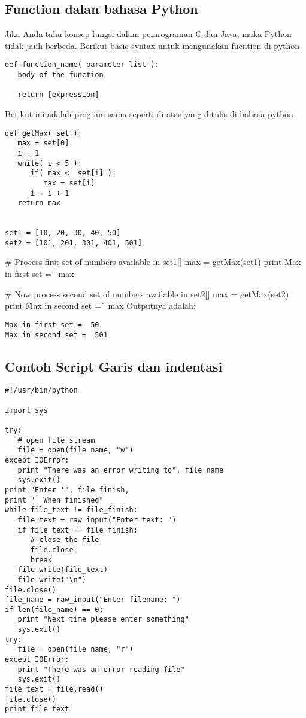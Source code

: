 \begin{enumerate}
\subsection {Function dalan bahasa Python}
Jika Anda tahu konsep fungsi dalam pemrograman C dan Java, maka Python tidak jauh berbeda. Berikut basic syntax untuk mengunakan fucntion di python 

\begin {verbatim}
def function_name( parameter list ):
   body of the function
   
   return [expression]
\end {verbatim}
Berikut ini adalah program sama seperti di atas yang ditulis di bahasa python 
\begin {verbatim}
def getMax( set ):
   max = set[0]
   i = 1  
   while( i < 5 ):
      if( max <  set[i] ):
         max = set[i]
      i = i + 1
   return max
 
 
set1 = [10, 20, 30, 40, 50]
set2 = [101, 201, 301, 401, 501]
\end {verbatim}
 
# Process first set of numbers available in set1[]
max = getMax(set1)
print \"Max in first set = \"\, max
     
# Now process second set of numbers available in set2[]
max = getMax(set2)
print \"Max in second set = \"\, max
Outputnya adalah: 
\begin {verbatim}
Max in first set =  50
Max in second set =  501
\end {verbatim}

\subsection{Contoh Script Garis dan indentasi}
\begin{verbatim}
#!/usr/bin/python

import sys

try:
   # open file stream
   file = open(file_name, "w")
except IOError:
   print "There was an error writing to", file_name
   sys.exit()
print "Enter '", file_finish,
print "' When finished"
while file_text != file_finish:
   file_text = raw_input("Enter text: ")
   if file_text == file_finish:
      # close the file
      file.close
      break
   file.write(file_text)
   file.write("\n")
file.close()
file_name = raw_input("Enter filename: ")
if len(file_name) == 0:
   print "Next time please enter something"
   sys.exit()
try:
   file = open(file_name, "r")
except IOError:
   print "There was an error reading file"
   sys.exit()
file_text = file.read()
file.close()
print file_text
\end{verbatim}


\end{enumerate}
